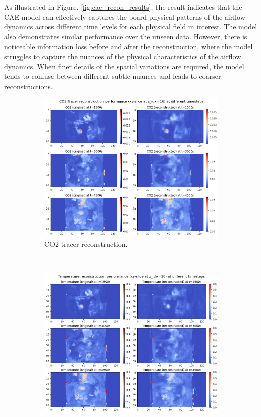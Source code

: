 \documentclass[final-report]{article-template}
\begin{document}
As illustrated in Figure. \ref{fig:cae_recon_results}, the result indicates that the CAE model can effectively captures the board physical patterns of the airflow dynamics across different time levels for each physical field in interest. The model also demonstrates similar performance over the unseen data. However, there is noticeable information loss before and after the reconstruction, where the model struggles to capture the nuances of the physical characteristics of the airflow dynamics. When finer details of the spatial variations are required, the model tends to confuse between different subtle nuances and leads to coarser reconstructions.
\begin{figure}[!htb]
    \centering
    \begin{subfigure}[t]{0.49\textwidth}
        \centering
        \includegraphics[width=\textwidth, trim=0cm 0cm 0cm 1cm, clip]{figures/co2_recon.png}
        \caption{CO2 tracer reconstruction.}
        \label{fig:co2_recon}
    \end{subfigure} \
    \begin{subfigure}[t]{0.49\textwidth}
        \centering
        \includegraphics[width=\textwidth, trim=0cm 0cm 0cm 1cm, clip]{figures/temp_recon.png}

\end{subfigure}
\end{figure}
\end{document}

